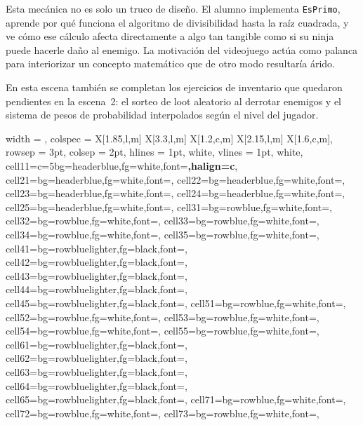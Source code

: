\documentclass[a4paper,12pt]{article}
\begin{document}
Esta mecánica no es solo un truco de diseño. El alumno implementa \texttt{EsPrimo},
aprende por qué funciona el algoritmo de divisibilidad hasta la raíz cuadrada, y ve
cómo ese cálculo afecta directamente a algo tan tangible como si su ninja puede
hacerle daño al enemigo. La motivación del videojuego actúa como palanca para
interiorizar un concepto matemático que de otro modo resultaría árido.

En esta escena también se completan los ejercicios de inventario que quedaron
pendientes en la escena~2: el sorteo de loot aleatorio al derrotar enemigos y el
sistema de pesos de probabilidad interpolados según el nivel del jugador.

\begin{longtblr}{
  width = \textwidth,
  colspec = {X[1.85,l,m] X[3.3,l,m] X[1.2,c,m] X[2.15,l,m] X[1.6,c,m]},
  rowsep = 3pt, colsep = 2pt,
  hlines = {1pt, white}, vlines = {1pt, white},
  cell{1}{1}={c=5}{bg=headerblue,fg=white,font=\large\bfseries,halign=c},
  cell{2}{1}={bg=headerblue,fg=white,font=\bfseries},
  cell{2}{2}={bg=headerblue,fg=white,font=\bfseries},
  cell{2}{3}={bg=headerblue,fg=white,font=\bfseries},
  cell{2}{4}={bg=headerblue,fg=white,font=\bfseries},
  cell{2}{5}={bg=headerblue,fg=white,font=\bfseries},
  cell{3}{1}={bg=rowblue,fg=white,font=\footnotesize},
  cell{3}{2}={bg=rowblue,fg=white,font=\footnotesize},
  cell{3}{3}={bg=rowblue,fg=white,font=\footnotesize},
  cell{3}{4}={bg=rowblue,fg=white,font=\footnotesize},
  cell{3}{5}={bg=rowblue,fg=white,font=\footnotesize},
  cell{4}{1}={bg=rowbluelighter,fg=black,font=\footnotesize},
  cell{4}{2}={bg=rowbluelighter,fg=black,font=\footnotesize},
  cell{4}{3}={bg=rowbluelighter,fg=black,font=\footnotesize},
  cell{4}{4}={bg=rowbluelighter,fg=black,font=\footnotesize},
  cell{4}{5}={bg=rowbluelighter,fg=black,font=\footnotesize},
  cell{5}{1}={bg=rowblue,fg=white,font=\footnotesize},
  cell{5}{2}={bg=rowblue,fg=white,font=\footnotesize},
  cell{5}{3}={bg=rowblue,fg=white,font=\footnotesize},
  cell{5}{4}={bg=rowblue,fg=white,font=\footnotesize},
  cell{5}{5}={bg=rowblue,fg=white,font=\footnotesize},
  cell{6}{1}={bg=rowbluelighter,fg=black,font=\footnotesize},
  cell{6}{2}={bg=rowbluelighter,fg=black,font=\footnotesize},
  cell{6}{3}={bg=rowbluelighter,fg=black,font=\footnotesize},
  cell{6}{4}={bg=rowbluelighter,fg=black,font=\footnotesize},
  cell{6}{5}={bg=rowbluelighter,fg=black,font=\footnotesize},
  cell{7}{1}={bg=rowblue,fg=white,font=\footnotesize},
  cell{7}{2}={bg=rowblue,fg=white,font=\footnotesize},
  cell{7}{3}={bg=rowblue,fg=white,font=\footnotesize},
}
\end{longtblr}
\end{document}
